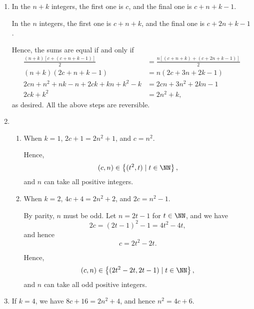 \Question{\currfilebase}
\begin{enumerate}
    \item In the \(n + k\) integers, the first one is \(c\), and the final one is \(c + n + k - 1\).

          In the \(n\) integers, the first one is \(c + n + k\), and the final one is \(c + 2n + k - 1\).

          Hence, the sums are equal if and only if
          \begin{align*}
              \frac{(n + k) [c + (c + n + k - 1)]}{2} & = \frac{n [(c + n + k) + (c + 2n + k - 1)]}{2} \\
              (n + k) (2c + n + k - 1)                & = n (2c + 3n + 2k - 1)                         \\
              2cn + n^2 + nk - n + 2ck + kn + k^2 - k & = 2cn + 3n^2 + 2kn - 1                         \\
              2ck + k^2                               & = 2n^2 + k,
          \end{align*}
          as desired. All the above steps are reversible.

    \item \begin{enumerate}
              \item When \(k = 1\), \(2c + 1 = 2n^2 + 1\), and \(c = n^2\).

                    Hence,
                    \[
                        (c, n) \in \left\{(t^2, t) \mid t \in \NN\right\},
                    \]
                    and \(n\) can take all positive integers.

              \item When \(k = 2\), \(4c + 4 = 2n^2 + 2\), and \(2c = n^2 - 1\).

                    By parity, \(n\) must be odd. Let \(n = 2t - 1\) for \(t \in \NN\), and we have
                    \[
                        2c = (2t - 1)^2 - 1 = 4t^2 - 4t,
                    \]
                    and hence
                    \[
                        c = 2t^2 - 2t.
                    \]

                    Hence,
                    \[
                        (c, n) \in \left\{(2t^2 - 2t, 2t - 1) \mid t \in \NN\right\},
                    \]
                    and \(n\) can take all odd positive integers.
          \end{enumerate}

    \item If \(k = 4\), we have \(8c + 16 = 2n^2 + 4\), and hence \(n^2 = 4c + 6\).


\end{enumerate}
